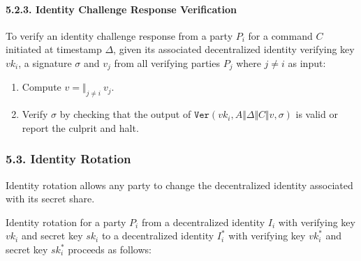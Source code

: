 \documentclass[
]{article}
\providecommand{\tightlist}{%
  \setlength{\itemsep}{0pt}\setlength{\parskip}{0pt}}
\begin{document}
\hypertarget{identity-challenge-verification}{%
\paragraph{5.2.3. Identity Challenge Response
Verification}\label{identity-challenge-verification}}

To verify an identity challenge response from a party \(P_i\) for a
command \(C\) initiated at timestamp \(\Delta\), given its associated
decentralized identity verifying key \(vk_i\), a signature \(\sigma\)
and \(v_j\) from all verifying parties \(P_j\) where \(j \neq i\) as
input:

\begin{enumerate}
\def\labelenumi{\arabic{enumi}.}
\tightlist
\item
  Compute \(v = \Vert _{j \neq i} \: v_j\).
\item
  Verify \(\sigma\) by checking that the output of
  \(\mathtt{Ver}(vk_i, A \Vert \Delta \Vert C \Vert v, \sigma)\) is
  valid or report the culprit and halt.
\end{enumerate}

\hypertarget{identity-rotation}{%
\subsubsection{5.3. Identity Rotation}\label{identity-rotation}}

Identity rotation allows any party to change the decentralized identity
associated with its secret share.

Identity rotation for a party \(P_i\) from a decentralized identity
\(I_i\) with verifying key \(vk_i\) and secret key \(sk_i\) to a
decentralized identity \(I_i^ \ast\) with verifying key \(vk_i^ \ast\)
and secret key \(sk_i^ \ast\) proceeds as follows:
\end{document}
